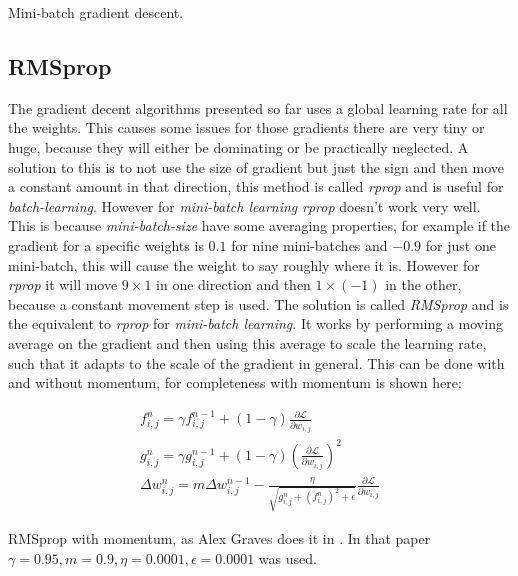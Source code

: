 \begin{algorithm}[h]
 \DontPrintSemicolon
 \caption{Mini-batch gradient descent.}
 \label{algorithm:gradientdecent:mini-batch}
\end{algorithm}

\subsection{RMSprop}

The gradient decent algorithms presented so far uses a global learning rate for all the weights. This causes some issues for those gradients there are very tiny or huge, because they will either be dominating or be practically neglected. A solution to this is to not use the size of gradient but just the sign and then move a constant amount in that direction, this method is called \textit{rprop} and is useful for \textit{batch-learning}. However for \textit{mini-batch learning} \textit{rprop} doesn't work very well. This is because \textit{mini-batch-size} have some averaging properties, for example if the gradient for a specific weights is $0.1$ for nine mini-batches and $-0.9$ for just one mini-batch, this will cause the weight to say roughly where it is. However for \textit{rprop} it will move $9 \times 1$ in one direction and then $1 \times (-1)$ in the other, because a constant movement step is used. The solution is called \textit{RMSprop} and is the equivalent to \textit{rprop} for \textit{mini-batch learning}. It works by performing a moving average on the gradient and then using this average to scale the learning rate, such that it adapts to the scale of the gradient in general. This can be done with and without momentum, for completeness with momentum is shown here:

\begin{equationbox}[H]
\begin{equation*}
\begin{aligned}
f_{i,j}^n = \gamma f_{i,j}^{n-1} + (1 - \gamma) \frac{\partial \mathcal{L}}{\partial w_{i,j}} \\
g_{i,j}^n = \gamma g_{i,j}^{n-1} + (1 - \gamma) \left(\frac{\partial \mathcal{L}}{\partial w_{i,j}}\right)^2 \\
\Delta w_{i,j}^n = m \Delta w_{i,j}^{n-1} - \frac{\eta}{\sqrt{g_{i,j}^n + \left(f_{i,j}^n\right)^2 + \epsilon}} \frac{\partial \mathcal{L}}{\partial w_{i,j}}
\end{aligned}
\end{equation*}
\caption{RMSprop with momentum, as Alex Graves does it in \cite{graves-generating-sequences}. In that paper $\gamma = 0.95, m = 0.9, \eta = 0.0001, \epsilon = 0.0001$ was used.}
\end{equationbox}

